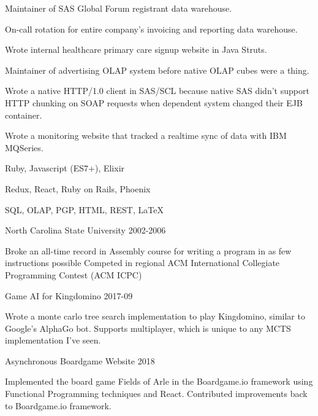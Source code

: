 \documentclass[11pt,english]{article}
\begin{document}
\begin{description}
Maintainer of SAS Global Forum registrant data warehouse.

On-call rotation for entire company's invoicing and reporting data warehouse.

Wrote internal healthcare primary care signup website in Java Struts.

Maintainer of advertising OLAP system before native OLAP cubes were a thing.

Wrote a native HTTP/1.0 client in SAS/SCL because native SAS didn't support HTTP chunking on SOAP requests when dependent system changed their EJB container.

Wrote a monitoring website that tracked a realtime sync of data with IBM MQSeries.

\end{description}


      {Ruby, Javascript (ES7+), Elixir}

      {Redux, React, Ruby on Rails, Phoenix}

      {SQL, OLAP, PGP, HTML, REST, \LaTeX}


\begin{description}
\squish
{} {North Carolina State University}
           {2002-2006}
 
Broke an all-time record in Assembly course for writing a program in as few instructions possible
Competed in regional ACM International Collegiate Programming Contest (ACM ICPC)

\end{description}


\begin{description}
\squish

           {Game AI for Kingdomino}
           {2017-09}

Wrote a monte carlo tree search implementation to play Kingdomino, similar to
Google's AlphaGo bot. Supports multiplayer, which is unique to any MCTS
implementation I've seen.

           {Asynchronous Boardgame Website}
           {2018}

Implemented the board game Fields of Arle in the Boardgame.io framework using Functional Programming techniques and React. Contributed improvements back to Boardgame.io framework.


\end{description}
\end{document}
